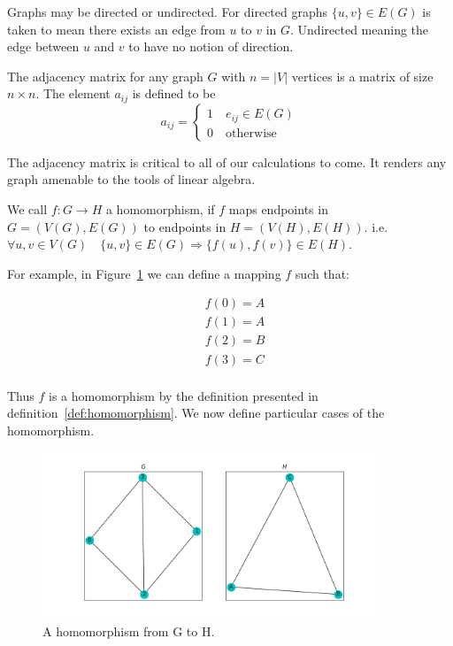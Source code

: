 Graphs may be directed or undirected. For directed graphs $\{u,v\} \in E(G)$
is taken to mean there exists an edge from $u$ to $v$ in $G$. Undirected meaning the 
edge between $u$ and $v$ to have no notion of direction.

\begin{dfn}
    The adjacency matrix for any graph $G$ with $n=|V|$ vertices is a matrix of size
    $n \times n$. The element $a_{ij}$ is defined to be
    $$
    a_{ij} = 
    \begin{cases}
        1 \quad e_{ij} \in E(G)\\
        0 \quad \text{otherwise}
    \end{cases}
    $$
    \label{def:adjmat}
\end{dfn}

\noindent The adjacency matrix is critical to all of our calculations to come. It renders
any graph amenable to the tools of linear algebra.

\begin{dfn}
\label{def:homomorphism}
We call $f: G \rightarrow H$ a homomorphism,
if $f$ maps endpoints in $G=(V(G),E(G))$ to endpoints in $H=(V(H),E(H))$.
i.e. $ \forall u,v \in V(G) \quad \{u,v\} \in E(G) \Rightarrow \{f(u),
f(v)\} \in E(H)$.
\end{dfn}


\noindent  For example, in Figure~\ref{fig:homomorphism} we can define a mapping $f$ such that:

\begin{align*}
    &f(0) = A\\
    &f(1) = A\\
    &f(2) = B\\
    &f(3) = C\\ 
\end{align*}

\noindent Thus $f$ is a homomorphism by the definition presented in definition~\ref{def:homomorphism}. 
We now define particular cases of the homomorphism.


\begin{figure}[h!]
    \includegraphics[width=10cm]{Images/graph_homomorphism.png}
    \centering
    \caption{A homomorphism from G to H.}
    \label{fig:homomorphism}
\end{figure}


